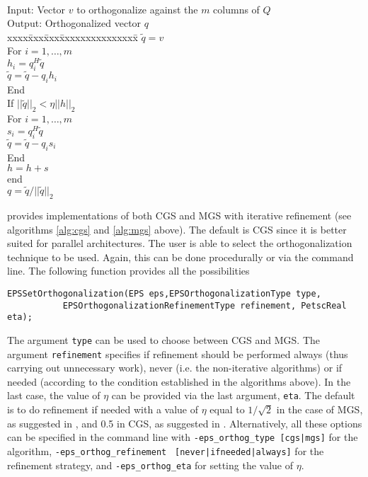 \begin{algorithm}~\rm
\begin{tabbing}
Input: Vector $v$ to orthogonalize against the $m$ columns of $Q$ \\
Output: Orthogonalized vector $q$ \\
xxxx\=xxx\=xxx\=xxxxxxxxxxxxxxx\=\kill
\> $\tilde{q}=v$\\
\> For $i=1,\ldots,m$\\
\> \> $h_i=q_i^H\tilde{q}$\\
\> \> $\tilde{q}=\tilde{q}-q_ih_i$\\
\> End\\
\> If $||\tilde{q}||_2<\eta||h||_2$\\
\> \> For $i=1,\ldots,m$\\
\> \> \> $s_i=q_i^H\tilde{q}$\\
\> \> \> $\tilde{q}=\tilde{q}-q_is_i$\\
\> \> End\\
\> \> $h=h+s$\\
\> end \\
\> $q=\tilde{q}/||\tilde{q}||_2$
\end{tabbing}
\end{algorithm}

	\slepc provides implementations of both CGS and MGS with iterative refinement (see algorithms \ref{alg:cgs} and \ref{alg:mgs} above). The default is CGS since it is better suited for parallel architectures. The user is able to select the orthogonalization technique to be used. Again, this can be done procedurally or via the command line. The following function provides all the possibilities
	\begin{Verbatim}[fontsize=\small]
	EPSSetOrthogonalization(EPS eps,EPSOrthogonalizationType type,
           EPSOrthogonalizationRefinementType refinement, PetscReal eta);
	\end{Verbatim}
The argument \Verb!type! can be used to choose between CGS and MGS. The argument \Verb!refinement! specifies if refinement should be performed always (thus carrying out unnecessary work), never (i.e. the non-iterative algorithms) or if needed (according to the condition established in the algorithms above). In the last case, the value of $\eta$ can be provided via the last argument, \Verb!eta!. The default is to do refinement if needed with a value of $\eta$ equal to $1/\sqrt{2}$ in the case of MGS, as suggested in \citep{Reichel:1990:FSU}, and 0.5 in CGS, as suggested in \citep{Hoffmann:1989:IAG}. Alternatively, all these options can be specified in the command line with \Verb!-eps_orthog_type [cgs|mgs]! for the algorithm, \Verb!-eps_orthog_refinement! \Verb! [never|ifneeded|always]! for the refinement strategy, and \Verb!-eps_orthog_eta! for setting the value of $\eta$.


